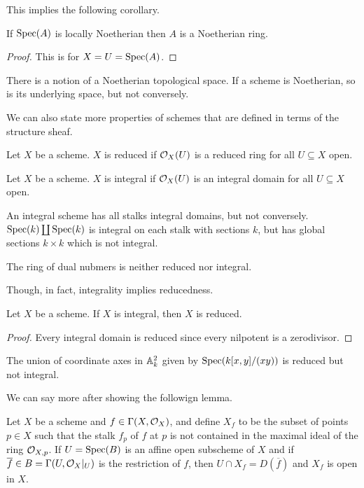This implies the following corollary. 
\begin{corollary}\label{corr: affine locally Noetherian is spectrum of Noetherian ring}
    If $\operatorname{Spec}(A)$ is locally Noetherian then $A$ is a Noetherian ring. 
\end{corollary}
\begin{proof}
    This is  for $X=U=\operatorname{Spec}(A)$. 
\end{proof}
\begin{remark}
    There is a notion of a Noetherian topological space. If a scheme is Noetherian, so is its underlying space, but not conversely. 
\end{remark}
We can also state more properties of schemes that are defined in terms of the structure sheaf. 
\begin{definition}\label{def: reduced scheme}
    Let $X$ be a scheme. $X$ is reduced if $\mathcal{O}_{X}(U)$ is a reduced ring for all $U\subseteq X$ open. 
\end{definition}
\begin{definition}\label{def: integral scheme}
    Let $X$ be a scheme. $X$ is integral if $\mathcal{O}_{X}(U)$ is an integral domain for all $U\subseteq X$ open. 
\end{definition}
\begin{remark}
    An integral scheme has all stalks integral domains, but not conversely. $\operatorname{Spec}(k)\coprod\operatorname{Spec}(k)$ is integral on each stalk with sections $k$, but has global sections $k\times k$ which is not integral. 
\end{remark}
\begin{example}
    The ring of dual nubmers  is neither reduced nor integral. 
\end{example}
Though, in fact, integrality implies reducedness. 
\begin{proposition}\label{prop: integral implies reduced}
    Let $X$ be a scheme. If $X$ is integral, then $X$ is reduced. 
\end{proposition}
\begin{proof}
    Every integral domain is reduced since every nilpotent is a zerodivisor. 
\end{proof}
\begin{example}
    The union of coordinate axes in $\mathbb{A}^{2}_{k}$ given by $\operatorname{Spec}(k[x,y]/(xy))$ is reduced but not integral.  
\end{example}
We can say more after showing the followign lemma. 
\begin{lemma}\label{lem: points where stalk is not in maximal ideal is open}
    Let $X$ be a scheme and $f\in\Gamma(X,\mathcal{O}_{X})$, and define $X_{f}$ to be the subset of points $p\in X$ such that the stalk $f_{p}$ of $f$ at $p$ is not contained in the maximal ideal of the ring $\mathcal{O}_{X,p}$. If $U=\operatorname{Spec}(B)$ is an affine open subscheme of $X$ and if $\overline{f}\in B=\Gamma(U,\mathcal{O}_{X}|_{U})$ is the restriction of $f$, then $U\cap X_{f}=D(\overline{f})$ and $X_{f}$ is open in $X$.
\end{lemma}
